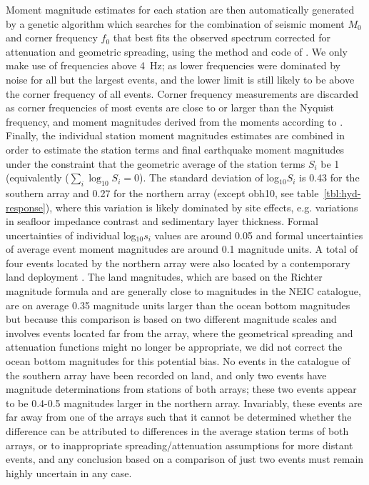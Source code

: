 \documentclass[reviewcopy]{elsarticle}
\begin{document}
Moment magnitude estimates for each station are
 then automatically generated by a genetic
 algorithm which searches for the combination of seismic moment $M_0$
 and corner frequency $f_0$ that best
 fits the observed spectrum corrected for attenuation and geometric
 spreading, using the method and code of
 \citet{ottemoeller03}.
We only make use of frequencies above 4~Hz; as lower frequencies were dominated by noise for all
but the largest events, and the
lower limit is still likely to be above the corner frequency of all events.
Corner frequency measurements
are discarded as corner frequencies of most events are close to or
larger than the Nyquist frequency, and moment magnitudes derived from
the moments according to \citet{kanamori77}.   Finally, the individual station
moment magnitudes estimates are combined in order to estimate the
station terms and final earthquake moment magnitudes under the
constraint that the geometric average of the station terms $S_i$ be
1 (equivalently ($\sum_i \log_{10}S_i=0$).
The standard deviation of
log$_{10}S_i$ is 0.43 for the southern array and 0.27 for the northern
array (except obh10, see table~\ref{tbl:hyd-response}), where this variation is likely
dominated by site effects, e.g. variations in seafloor impedance
contrast and sedimentary layer thickness. Formal uncertainties of individual log$_{10}s_i$ values are
around 0.05 and formal uncertainties of average event moment
magnitudes are around 0.1 magnitude units.
A total of four events located by the northern array were also located
by a contemporary land deployment \citep{lange07}.
 The land magnitudes, which are based on the Richter magnitude
formula and are generally close to magnitudes in the NEIC catalogue, are on average 0.35 magnitude units larger
than the ocean bottom magnitudes but because this comparison is based
on two different magnitude scales and involves  events located far
from the array, where the geometrical
spreading and attenuation functions might no longer be appropriate, we
did not correct the ocean bottom magnitudes for this potential bias.
No events in the catalogue of the southern array  have been recorded
on land, and only two events have magnitude determinations from
stations of both arrays; these two events appear to be 0.4-0.5
magnitudes larger in the northern array.  Invariably, these events are
far away from one of the arrays such that it cannot be determined whether the
difference can be attributed to differences in the average station
terms of both arrays, or to inappropriate spreading/attenuation
assumptions for more distant events, and any conclusion based on a
comparison of just two events must remain highly uncertain in any case.
\end{document}
